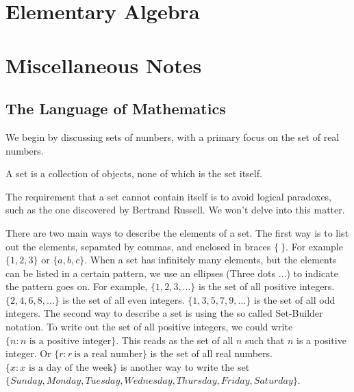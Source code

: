 \documentclass[crop=false,class=article,oneside]{standalone}
\begin{document}
    \ifx\ifmathcourseselementaryalgebra\undefined
        \section*{Elementary Algebra}
        \setcounter{section}{2}
    \else
        \section{Miscellaneous Notes}
    \fi
    \subsection{The Language of Mathematics}
        We begin by discussing sets of numbers,
        with a primary focus on the set of real numbers.
        \begin{definition}
            A set is a collection of objects,
            none of which is the set itself.
        \end{definition}
        \begin{remark}
            The requirement that a set cannot contain itself
            is to avoid logical paradoxes,
            such as the one discovered by Bertrand Russell.
            We won't delve into this matter.
        \end{remark}
        \begin{remark}
            There are two main ways to describe the elements of a set.
            The first way is to list out the elements, separated by commas,
            and enclosed in braces $\{\ \}$. For example $\{1,2,3\}$ or
            $\{a,b,c\}$. When a set has infinitely many elements, but the
            elements can be listed in a certain pattern, we use an ellipses
            (Three dots $\hdots$) to indicate the pattern goes on.
            For example, $\{1,2,3,\hdots\}$ is the set of all positive
            integers. $\{2,4,6,8,\hdots\}$ is the set of all even integers.
            $\{1,3,5,7,9,\hdots\}$ is the set of all odd integers. The second
            way to describe a set is using the so called Set-Builder notation.
            To write out the set of all positive integers, we could write
            $\{n:n\textrm{ is a positive integer}\}$.
            This reads as the set of all $n$ such that $n$ is a
            positive integer. Or $\{r: r\ \textrm{is a real number}\}$
            is the set of all real numbers.
            $\{x:x\textrm{ is a day of the week}\}$ is another way
            to write the set
            $\{Sunday,Monday,Tuesday,Wednesday,Thursday,Friday,Saturday\}$.
        \end{remark}
\end{document}
